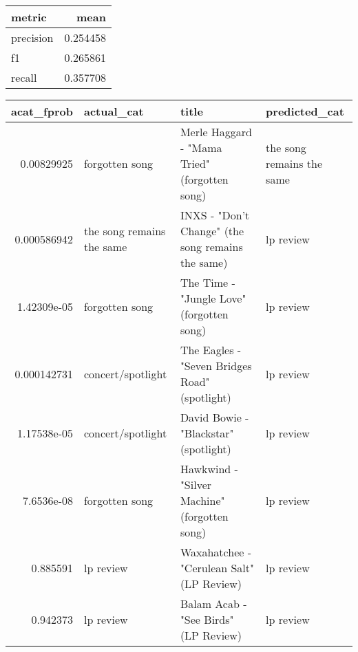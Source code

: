 \documentclass[letterpaper,10pt]{article}
\begin{document}
\begin{tabular}{lr}
\hline
 metric    &     mean \\
\hline
 precision & 0.254458 \\
 f1        & 0.265861 \\
 recall    & 0.357708 \\
\hline
\end{tabular}

\begin{table}[H]
 \begin{adjustbox}{max width=\linewidth}
\begin{tabular}{rlll}
\hline
   acat\_fprob & actual\_cat                & title                                                                                                        & predicted\_cat             \\
\hline
  0.00829925  & forgotten song            & Merle Haggard - "Mama Tried" (forgotten song)                                                                & the song remains the same \\
  0.000586942 & the song remains the same & INXS - "Don't Change" (the song remains the same)                                                            & lp review                 \\
  1.42309e-05 & forgotten song            & The Time - "Jungle Love" (forgotten song)                                                                    & lp review                 \\
  0.000142731 & concert/spotlight         & The Eagles - "Seven Bridges Road" (spotlight)                                                                & lp review                 \\
  1.17538e-05 & concert/spotlight         & David Bowie - "Blackstar" (spotlight)                                                                        & lp review                 \\
  7.6536e-08  & forgotten song            & Hawkwind - "Silver Machine" (forgotten song)                                                                 & lp review                 \\
  0.885591    & lp review                 & Waxahatchee - "Cerulean Salt" (LP Review)                                                                    & lp review                 \\
  0.942373    & lp review                 & Balam Acab - "See Birds" (LP Review)                                                                         & lp review                 \\

\end{tabular}
\end{adjustbox}
\end{table}
\end{document}
